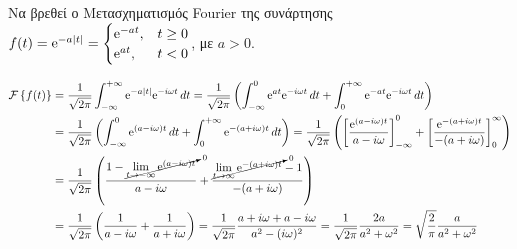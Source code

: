 \begin{example}
  Να βρεθεί ο Μετασχηματισμός Fourier της συνάρτησης 
  $ f(t) = \mathrm{e}^{-a \abs{t}} = 
  \begin{cases}
    \mathrm{e}^{-at}, & t \geq 0 \\
    \mathrm{e}^{at} , & {t} < 0
  \end{cases}$, με $ a>0 $.
\end{example}
\begin{solution}
  \begin{align*}
    \mathcal{F}\left\{f(t)\right\} 
    &= \frac{1}{\sqrt{2 \pi}} \int_{-\infty}^{+\infty} 
    \mathrm{e}^{-a \abs{t}} \mathrm{e}^{-i\omega t} \,{dt} = \frac{1}{\sqrt{2 \pi}} 
    \left(\int_{-\infty}^{0} \mathrm{e}^{at} \mathrm{e}^{-i\omega t} \,{dt} +
    \int_{0}^{+\infty} \mathrm{e}^{-at} \mathrm{e}^{-i\omega t} \,{dt} \right) \\
    &= \frac{1}{\sqrt{2 \pi}} \left(\int _{- \infty}^{0} \mathrm{e}^{(a-i\omega)t} 
      \,{dt} + \int_{0}^{+\infty} \mathrm{e}^{-(a+i\omega)t} \,{dt}\right) 
    = \frac{1}{\sqrt{2 \pi}} \left(\left[\frac{\mathrm{e}^{(a-i\omega)t}}{a-i\omega}
        \right]_{- \infty}^{0} + \left[\frac{\mathrm{e}^{-(a+i\omega)t}}{-(a+i\omega)}
    \right]_{0}^{\infty} \right) \\
    &= \frac{1}{\sqrt{2 \pi}} \left(\frac{1- \cancelto{0}{\lim\limits_{t \to - \infty}
          \mathrm{e}^{(a-i\omega)t}}}{a-i\omega} + \frac{\cancelto{0}{\lim\limits_{t \to \infty}
\mathrm{e}^{-(a+i\omega)t}} -1 }{-(a+i\omega)}  \right) \\
    &= \frac{1}{\sqrt{2 \pi}} \left(\frac{1}{a- i\omega} + \frac{1}{a+i \omega}\right) 
    = \frac{1}{\sqrt{2 \pi}} \frac{a+i\omega+a-i\omega}{a^{2}-(i\omega)^{2}} = 
    \frac{1}{\sqrt{2 \pi}} \frac{2a}{a^{2}+\omega^{2}} = \sqrt{\frac{2}{\pi}}
    \frac{a}{a^{2}+\omega^{2}} 
  \end{align*}
\end{solution}




